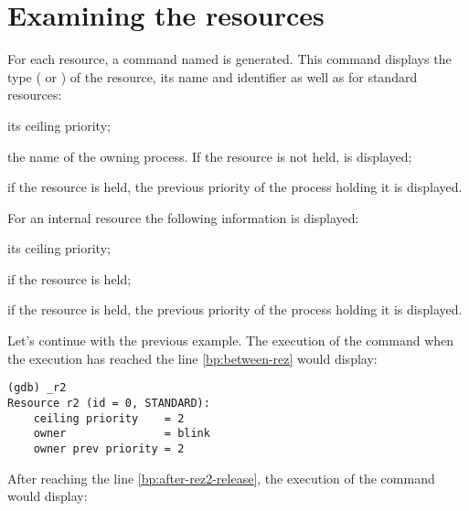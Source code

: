 
\section{Examining the resources}

For each resource, a command named  is generated. This command displays the type ( or ) of the resource, its name and identifier as well as for standard resources:

\begin{pitemize}
\item its ceiling priority;
\item the name of the owning process. If the resource is not held,  is displayed;
\item if the resource is held, the previous priority of the process holding it is displayed.
\end{pitemize}

For an internal resource the following information is displayed:

\begin{pitemize}
\item its ceiling priority;
\item if the resource is held;
\item if the resource is held, the previous priority of the process holding it is displayed.
\end{pitemize}

Let's continue with the previous example. The execution of the command  when the execution has reached the line \ref{bp:between-rez} would display:

\begin{lstlisting}
(gdb) _r2
Resource r2 (id = 0, STANDARD):
	ceiling priority    = 2
	owner               = blink
	owner prev priority = 2
\end{lstlisting} 

After reaching the line \ref{bp:after-rez2-release}, the execution of the command  would display:

